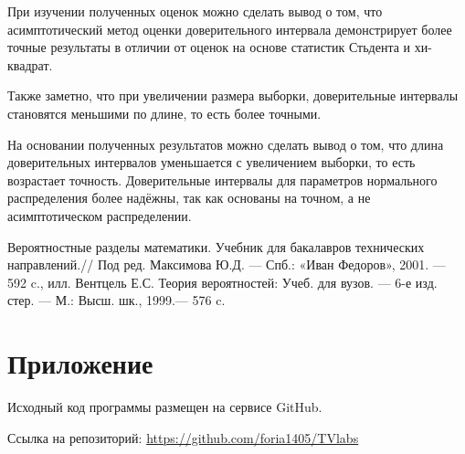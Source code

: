 \documentclass[12pt]{article}
\begin{document}
	При изучении полученных оценок можно сделать вывод о том, что асимптотический метод оценки доверительного интервала демонстрирует более точные результаты в отличии от оценок на основе статистик Стьдента и хи-квадрат. 
	
	Также заметно, что при увеличении размера выборки, доверительные интервалы становятся меньшими по длине, то есть более точными.

На основании полученных результатов можно сделать вывод о том, что длина доверительных интервалов уменьшается с увеличением выборки, то есть возрастает точность. Доверительные интервалы для параметров нормального распределения более надёжны, так как основаны на точном, а не асимптотическом распределении.

\newpage





\begin{thebibliography}{}
	  Вероятностные разделы математики. Учебник для бакалавров технических направлений.// Под ред. Максимова Ю.Д. — Спб.: «Иван Федоров», 2001. — 592 c., илл.
	  Вентцель Е.С. Теория вероятностей: Учеб. для вузов. — 6-е изд. стер. — М.: Высш. шк., 1999.— 576 c.
\end{thebibliography}
\newpage
\appendix


\section{Приложение}
\label{sec:A}
\par Исходный код программы размещен на сервисе GitHub.
\par Ссылка на репозиторий: \url{https://github.com/foria1405/TVlabs}
\end{document}
